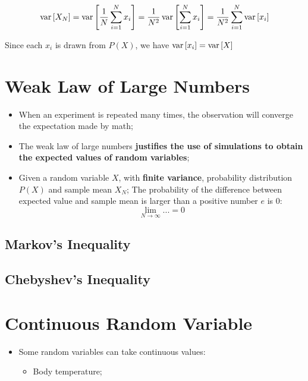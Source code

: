     \begin{equation}
      \operatorname{var} \left[ X_{N} \right] = \operatorname{var} \left[ \frac{1}{N} \sum_{i = 1}^{N} x_{i} \right] = \frac{1}{ N^{2} } \operatorname{var} \left[ \sum_{i = 1}^{N} x_{i} \right] = \frac{1}{N^{2}} \sum_{i = 1}^{N} \operatorname{var} \left[ x_{i} \right]
    \end{equation}
    
    Since each $ x_{i} $ is drawn from $ P(X) $, we have $ \operatorname{var} \left[ x_{i} \right] = \operatorname{var} \left[ X \right] $  

\section{Weak Law of Large Numbers}

  \begin{itemize}
    \item When an experiment is repeated many times, the observation will converge the expectation made by math;
    \item The weak law of large numbers \textbf{justifies the use of simulations to obtain the expected values of random variables};
    \item Given a random variable $ X $, with \textbf{finite variance}, probability distribution $ P(X) $ and sample mean $ X_{N} $; The probability of the difference between expected value and sample mean is larger than a positive number $ e $ is 0:
    \begin{equation}
      \lim_{N \to \infty} ... = 0
    \end{equation}
  \end{itemize}
  
  \subsection{Markov's Inequality}
  \subsection{Chebyshev's Inequality}
  
\section{Continuous Random Variable}

  \begin{itemize}
    \item Some random variables can take continuous values:
    \begin{itemize}
      \item Body temperature;
    \end{itemize}
  \end{itemize}
  
